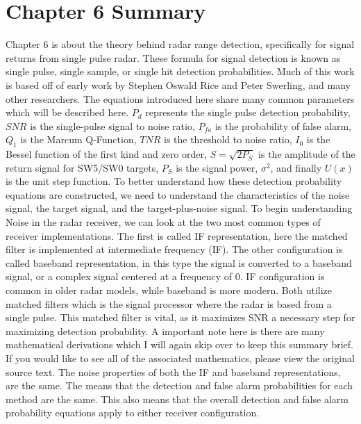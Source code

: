 \documentclass[12pt]{article}
\begin{document}
\section{Chapter 6 Summary}
Chapter 6 is about the theory behind radar range detection, specifically for signal returns from single pulse radar. These formula for signal detection is known as single pulse, single sample, or single hit detection probabilities. Much of this work is based off of early work by Stephen Oswald Rice and Peter Swerling, and many other researchers. The equations introduced here share many common parameters which will be described here. $P_d$ represents the single pulse detection probability, $SNR$ is the single-pulse signal to noise ratio, $P_{fa}$ is the probability of false alarm, $Q_1$ is the Marcum Q-Function, $TNR$ is the threshold to noise ratio, $I_0$ is the Bessel function of the first kind and zero order, $S=\sqrt{2 P_{S}}$ is the amplitude of the return signal for SW5/SW0 targets, $P_S$ is the signal power, $\sigma^2$, and finally $U(x)$ is the unit step function. To better understand how these detection probability equations are constructed, we need to understand the characteristics of the noise signal, the target signal, and the target-plus-noise signal. 
To begin understanding Noise in the radar receiver, we can look at the two most common types of receiver implementations. The first is called IF representation, here the matched filter is implemented at intermediate frequency (IF). The other configuration is called baseband representation, in this type the signal is converted to a baseband signal, or a complex signal centered at a frequency of 0. IF configuration is common in older radar models, while baseband is more modern. Both utilize matched filters which is the signal processor where the radar is based from a single pulse. This matched filter is vital, as it maximizes SNR a necessary step for maximizing detection probability. 
A important note here is there are many mathematical derivations which I will again skip over to keep this summary brief. If you would like to see all of the associated mathematics, please view the original source text. 
The noise properties of both the IF and baseband representations, are the same. The means that the detection and false alarm probabilities for each method are the same. This also means that the overall detection and false alarm probability equations apply to either receiver configuration. 
\end{document}
